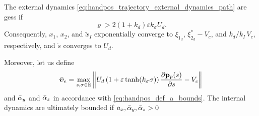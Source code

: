 \begin{prop}
    \label{prop:handpos_trajectory_path_following}
    The external dynamics \eqref{eq:handpos_trajectory_external_dynamics_path} are \glspl{ges} if
    \begin{equation}
        \varrho > 2\left(1 + k_d\right)\varepsilon k_{\sigma} U_d.
    \end{equation}
    Consequently, $x_1$, $x_2$, and $\tilde{x}_I$ exponentially converge to $\xi_{1_d}$, $\xi_{2_d}^{*} - V_c$, and $k_d/k_I\,V_c$, respectively, and $\dot{s}$ converges to $U_d$.

    Moreover, let us define 
    \begin{equation}
        \Bar{\bm{\upsilon}}_e = \max_{s, \sigma \in \mathbb{R}} \left\|
            U_d\left(1 + \varepsilon\tanh(k_{\sigma}\sigma)\right) \frac{\partial \mathbf{p}_p(s)}{\partial s}
            - V_c\right\|
            \label{eq:handpos_trajectory_LBnu_path}
    \end{equation}
    and $\Bar{\alpha}_y$ and $\Bar{\alpha}_z$ in accordance with \eqref{eq:handpos_def_a_bounds}.
    The internal dynamics are ultimately bounded if $a_x, \Bar{\alpha}_y, \Bar{\alpha}_z > 0$
\end{prop}
